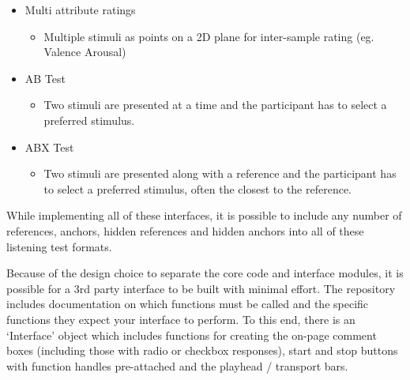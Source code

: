 \documentclass{sig-alternate}
\begin{document}
\begin{itemize}[noitemsep,nolistsep]
		\item Multi attribute ratings
		\begin{itemize}[noitemsep,nolistsep]
			\item Multiple stimuli as points on a 2D plane for inter-sample rating (eg. Valence Arousal)
		\end{itemize}
		\item AB Test~\cite{lipshitz1981great}
		\begin{itemize}[noitemsep,nolistsep]
			\item Two stimuli are presented at a time and the participant has to select a preferred stimulus.
		\end{itemize}
		\item ABX Test~\cite{clark1982high}
		\begin{itemize}[noitemsep,nolistsep]
			\item Two stimuli are presented along with a reference and the participant has to select a preferred stimulus, often the closest to the reference.
		\end{itemize}
	\end{itemize}
	
	While implementing all of these interfaces, it is possible to include any number of references, anchors, hidden references and hidden anchors into all of these listening test formats.
	
	Because of the design choice to separate the core code and interface modules, it is possible for a 3rd party interface to be built with minimal effort. The repository includes documentation on which functions must be called and the specific functions they expect your interface to perform. To this end, there is an `Interface' object which includes functions for creating the on-page comment boxes (including those with radio or checkbox responses), start and stop buttons with function handles pre-attached and the playhead / transport bars.
	
\end{document}
